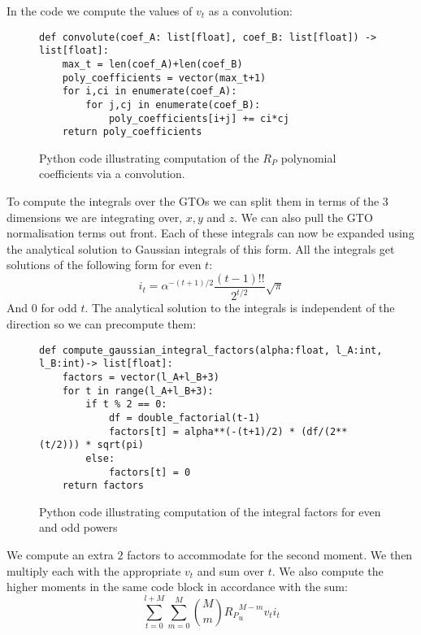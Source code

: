 In the code we compute the values of $v_t$ as a convolution:
\begin{figure}[H]
\begin{verbatim}
def convolute(coef_A: list[float], coef_B: list[float]) -> list[float]:
    max_t = len(coef_A)+len(coef_B)
    poly_coefficients = vector(max_t+1)
    for i,ci in enumerate(coef_A):
        for j,cj in enumerate(coef_B):
            poly_coefficients[i+j] += ci*cj
    return poly_coefficients
\end{verbatim}
    \caption{Python code illustrating computation of the $R_P$ polynomial coefficients via a convolution.}
\end{figure}


To compute the integrals over the GTOs we can split them in terms of the $3$ dimensions we are integrating over, $x,y$ and $z$. We can also pull the GTO normalisation terms out front. 
Each of these integrals can now be expanded using the analytical solution to Gaussian integrals of this form. All the integrals get solutions of the following form for even $t$\cite[eq. 5.53]{daudel1983}:
\begin{equation}
    i_t = \alpha^{-(t+1)/2}\frac{(t-1)!!}{2^{t/2}}\sqrt{\pi}
\end{equation}
And 0 for odd $t$.
The analytical solution to the integrals is independent of the direction so we can precompute them: 
\begin{figure}[H]
\begin{verbatim}
def compute_gaussian_integral_factors(alpha:float, l_A:int, l_B:int)-> list[float]:
    factors = vector(l_A+l_B+3)
    for t in range(l_A+l_B+3):
        if t % 2 == 0:
            df = double_factorial(t-1)
            factors[t] = alpha**(-(t+1)/2) * (df/(2**(t/2))) * sqrt(pi)
        else:
            factors[t] = 0
    return factors
\end{verbatim}
    \caption{Python code illustrating computation of the integral factors for even and odd powers}
\end{figure}
We compute an extra $2$ factors to accommodate for the second moment. 
We then multiply each with the appropriate $v_t$ and sum over $t$\cite[eq. 5.49]{daudel1983}.
We also compute the higher moments\cite[sec. 5.2.2.5]{daudel1983} in the same code block in accordance with the sum:
\begin{equation}
    \sum_{t=0}^{l+M}\sum_{m=0}^M \binom{M}{m}{R_P}_u^{M-m}v_ti_t
\end{equation}
